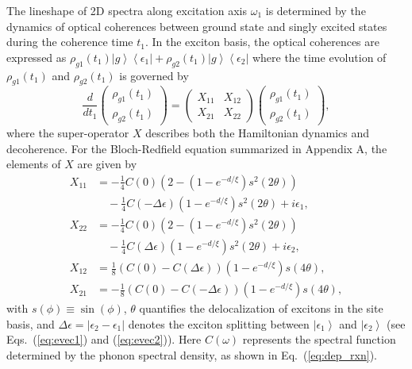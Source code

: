 \documentclass[%
 reprint,%
 amssymb, amsmath,%
 aip,cha,%
]{revtex4-1}
\newcommand{\bra}[1]{\ensuremath{\left\langle{#1}\right\vert}}
\newcommand{\ket}[1]{\ensuremath{\left|{#1}\right\rangle}}
\newcommand{\abs}[1]{\left|#1\right|}
\begin{document}
The lineshape of 2D spectra along excitation axis $\omega_1$ is determined by the dynamics of optical coherences between ground state and singly excited states during the coherence time $t_1$. In the exciton basis, the optical coherences are expressed as $\rho_{g1}(t_1)\ket{g}\bra{\epsilon_{1}}+\rho_{g2}(t_1)\ket{g}\bra{\epsilon_{2}}$ where the time evolution of $\rho_{g1}(t_1)$ and $\rho_{g2}(t_1)$ is governed by
\begin{equation}
\frac{d}{dt_1}
\begin{pmatrix}
	\rho_{g1}(t_1) \\ \rho_{g2}(t_1)
\end{pmatrix}
=
\begin{pmatrix}
	X_{11} & X_{12} \\ X_{21} & X_{22}
\end{pmatrix}
\begin{pmatrix}
	\rho_{g1}(t_1) \\ \rho_{g2}(t_1)
\end{pmatrix},
\label{eq:X_eq}
\end{equation}
where the super-operator $X$ describes both the Hamiltonian dynamics and decoherence.  For the Bloch-Redfield equation summarized in Appendix A, the elements of $X$ are given by
\begin{align}
	X_{11} &= -\frac{1}{4}C(0)(2-(1-e^{-d/\xi})s^{2}(2\theta))\label{eq:X11}\\
	&\quad-\frac{1}{4}C(-\Delta\epsilon)(1-e^{-d/\xi})s^{2}(2\theta)+i\epsilon_1,\nonumber\\
	X_{22} &= -\frac{1}{4}C(0)(2-(1-e^{-d/\xi})s^{2}(2\theta))\\
	&\quad-\frac{1}{4}C(\Delta\epsilon)(1-e^{-d/\xi})s^{2}(2\theta)+i\epsilon_2,\nonumber\\
	X_{12} &= \frac{1}{8}(C(0)-C(\Delta\epsilon))(1-e^{-d/\xi})s(4\theta),\label{eq:X12}\\
	X_{21} &= -\frac{1}{8}(C(0)-C(-\Delta\epsilon))(1-e^{-d/\xi})s(4\theta),\label{eq:X21}
\end{align}
with $s(\phi)\equiv\sin(\phi)$, $\theta$ quantifies the delocalization of excitons in the site basis, and $\Delta\epsilon=\abs{\epsilon_2-\epsilon_1}$ denotes the exciton splitting between $\ket{\epsilon_1}$ and $\ket{\epsilon_2}$ (see Eqs.~(\ref{eq:evec1}) and (\ref{eq:evec2})). Here $C(\omega)$ represents the spectral function determined by the phonon spectral density, as shown in Eq.~(\ref{eq:dep_rxn}).
\end{document}
